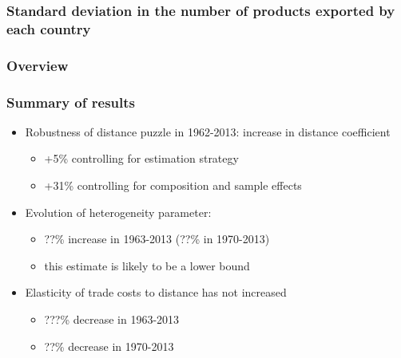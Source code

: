 \documentclass{beamer}
\begin{document}
\begin{frame}[plain]\frametitle{Standard deviation in the number of products exported by each country }
\begin{figure}[h!]
	\begin{center}
		\setlength{\fboxrule}{1pt} %
		\setlength{\fboxsep}{.1in} %
	\end{center}
\end{figure}
\end{frame}

\begin{frame}
	\frametitle{Overview} 
	\tableofcontents
\end{frame}


\begin{frame}[plain]\frametitle{Summary of results}
\vspace{0.3cm}
\begin{itemize}
\item Robustness of distance puzzle in 1962-2013: increase in distance coefficient 
\begin{itemize}
\item +5\% controlling for estimation strategy
\item +31\% controlling for composition and sample effects
\end{itemize}
\vspace{0.3cm}
\item Evolution of heterogeneity parameter:
\begin{itemize}
\item ??\% increase in 1963-2013 (??\% in 1970-2013)
\item this estimate is likely to be a lower bound 
\end{itemize}
\vspace{0.3cm}
\item Elasticity of trade costs to distance has not increased
\begin{itemize}
\item ???\% decrease in 1963-2013
\item ??\% decrease in 1970-2013

\end{itemize}
\end{itemize}
\end{frame}
\end{document}
